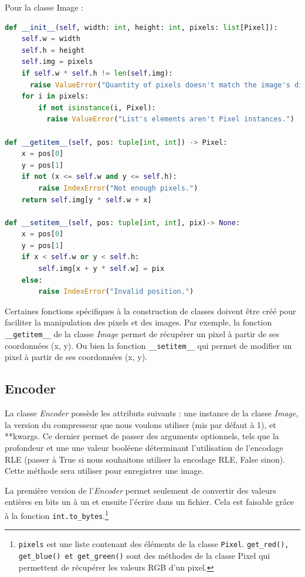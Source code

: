 \documentclass[utf8]{article}
\begin{document}
Pour la classe Image : 

\begin{lstlisting}[language=Python, basicstyle=\small]
 def __init__(self, width: int, height: int, pixels: list[Pixel]):
    self.w = width
    self.h = height
    self.img = pixels
    if self.w * self.h != len(self.img):
      raise ValueError("Quantity of pixels doesn't match the image's dimension.")
    for i in pixels:
        if not isinstance(i, Pixel):
		  raise ValueError("List's elements aren't Pixel instances.")

def __getitem__(self, pos: tuple[int, int]) -> Pixel:
    x = pos[0]
    y = pos[1]
    if not (x <= self.w and y <= self.h):
        raise IndexError("Not enough pixels.")
    return self.img[y * self.w + x]

def __setitem__(self, pos: tuple[int, int], pix)-> None:
    x = pos[0]
    y = pos[1]
    if x < self.w or y < self.h:
        self.img[x + y * self.w] = pix
    else:
        raise IndexError("Invalid position.")

\end{lstlisting}
Certaines fonctions spécifiques à la construction de classes doivent être créé pour faciliter la manipulation des pixels et des images. Par exemple, la fonction \texttt{__getitem__} de la classe \textit{Image} permet de récupérer un pixel à partir de ses coordonnées (x, y).
Ou bien la fonction \texttt{__setitem__} qui permet de modifier un pixel à partir de ses coordonnées (x, y).


\subsection{Encoder}
La classe \textit{Encoder} possède les attributs suivants : une instance de la classe \textit{Image}, la version du compresseur que nous  voulons utiliser (mis par défaut à 1), et **kwargs. Ce dernier permet de passer des arguments optionnels, tels que la profondeur et une une valeur booléene déterminant l'utilisation de l'encodage RLE (passer à True si nous souhaitons utiliser la encodage RLE, False sinon). Cette méthode sera utiliser pour enregistrer une image.

La première version de l'\textit{Encoder} permet seulement de convertir des valeurs entières en bits un à un et ensuite l'écrire dans un fichier. Cela est faisable grâce à la fonction \texttt{int.to_bytes}.\footnote{\texttt{pixels} est une liste contenant des éléments de la classe \texttt{Pixel}. \texttt{get_red(), get_blue() et get_green()} sont des méthodes de la classe Pixel qui permettent de récupérer les valeurs RGB d'un pixel.}
\end{document}
